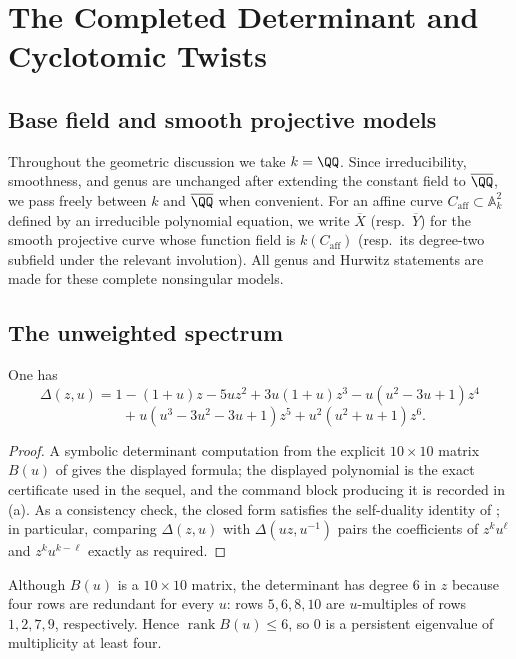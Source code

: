 \section{The Completed Determinant and Cyclotomic Twists}
\label{sec:completion-twists}

\subsection*{Base field and smooth projective models}

Throughout the geometric discussion we take \(k=\QQ\). Since
irreducibility, smoothness, and genus are unchanged after extending the
constant field to \(\overline{\QQ}\), we pass freely between \(k\) and
\(\overline{\QQ}\) when convenient. For an affine curve
\(C_{\mathrm{aff}}\subset\mathbb{A}^2_k\) defined by an irreducible
polynomial equation, we write \(\overline{X}\) (resp.\ \(\overline{Y}\))
for the smooth projective curve whose function field is
\(k(C_{\mathrm{aff}})\) (resp.\ its degree-two subfield under the
relevant involution). All genus and Hurwitz statements are made for
these complete nonsingular models.

\subsection{The unweighted spectrum}

\begin{proposition}\label{prop:kernel-delta-explicit}
One has
\[
  \Delta(z,u)
  =1-(1+u)z-5uz^2+3u(1+u)z^3-u(u^2-3u+1)z^4
\]
\[
  \qquad
  +u(u^3-3u^2-3u+1)z^5+u^2(u^2+u+1)z^6.
\]
\end{proposition}

\begin{proof}
A symbolic determinant computation from the explicit \(10\times 10\)
matrix \(B(u)\) of  gives the displayed formula;
the displayed polynomial is the exact certificate used in the sequel,
and the command block producing it is recorded in
\,\textup{(a)}.
As a consistency check, the closed form satisfies the self-duality
identity of ; in particular, comparing
\(\Delta(z,u)\) with \(\Delta(uz,u^{-1})\) pairs the coefficients of
\(z^k u^\ell\) and \(z^k u^{k-\ell}\) exactly as required.
\end{proof}

Although \(B(u)\) is a \(10\times 10\) matrix, the determinant has
degree \(6\) in \(z\) because four rows are redundant for every \(u\):
rows \(5,6,8,10\) are \(u\)-multiples of rows \(1,2,7,9\),
respectively. Hence \(\operatorname{rank} B(u)\le 6\), so \(0\) is a
persistent eigenvalue of multiplicity at least four.

